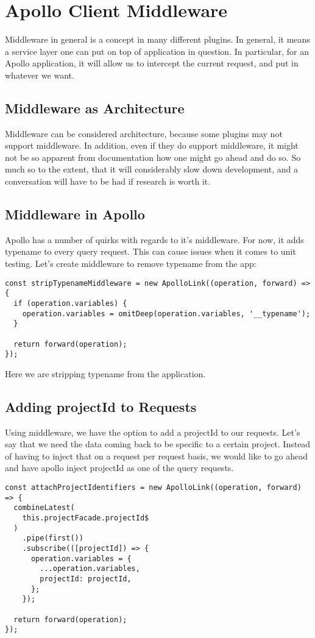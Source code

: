 \maketitle{}
\section{ Apollo Client Middleware }

Middleware in general is a concept in many different plugins. In general, it
means a service layer one can put on top of application in question. In
particular, for an Apollo application, it will allow us to intercept the
current request, and put in whatever we want.

\subsection{ Middleware as Architecture }
Middleware can be considered architecture, because some plugins may not support
middleware. In addition, even if they do support middleware, it might not be so
apparent from documentation how one might go ahead and do so. So much so to the
extent, that it will considerably slow down development, and a conversation will
have to be had if research is worth it.

\subsection{ Middleware in Apollo }
Apollo has a number of quirks with regards to it's middleware. For now, it adds
typename to every query request. This can cause issues when it comes to unit
testing. Let's create middleware to remove typename from the app:
\begin{lstlisting}
const stripTypenameMiddleware = new ApolloLink((operation, forward) => {
  if (operation.variables) {
    operation.variables = omitDeep(operation.variables, '__typename');
  }

  return forward(operation);
});
\end{lstlisting}

Here we are stripping typename from the application.

\subsection{ Adding projectId to Requests }

Using middleware, we have the option to add a projectId to our requests. Let's
say that we need the data coming back to be specific to a certain project.
Instead of having to inject that on a request per request basis, we would like
to go ahead and have apollo inject projectId as one of the query requests.
\begin{lstlisting}
const attachProjectIdentifiers = new ApolloLink((operation, forward) => {
  combineLatest(
    this.projectFacade.projectId$
  )
    .pipe(first())
    .subscribe(([projectId]) => {
      operation.variables = {
        ...operation.variables,
        projectId: projectId,
      };
    });

  return forward(operation);
});
\end{lstlisting}
